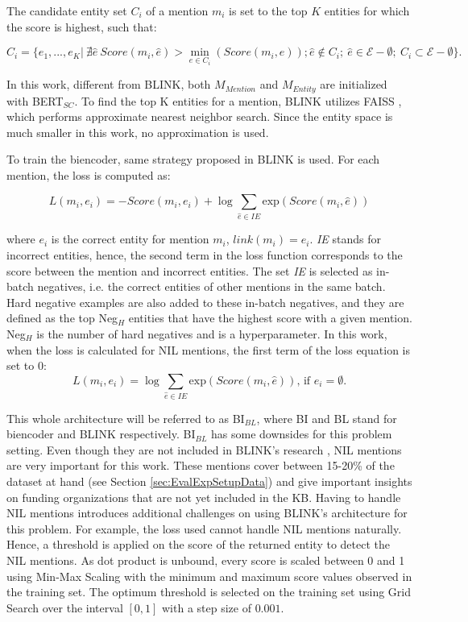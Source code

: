 \documentclass{report}
\theoremstyle{definition}
\theoremstyle{remark}
\begin{document}
The candidate entity set $C_i$ of a mention $m_i$ is set to the top $K$ entities for which the score is highest, such that:

\begin{equation}
    C_i = \{e_1,...,e_K | \ \nexists\hat{e} \ Score(m_i,\hat{e}) > \min_{e\in C_i}(Score(m_i, e )); \hat{e} \notin C_i; \ \hat{e} \in \mathcal{E}-\emptyset; \ C_i \subset \mathcal{E}-\emptyset  \}.
\end{equation}

In this work, different from BLINK, both $M_{Mention}$ and $M_{Entity}$ are initialized with BERT$_{SC}$. To find the top K entities for a mention, BLINK utilizes FAISS \cite{faiss}, which performs approximate nearest neighbor search. Since the entity space is much smaller in this work, no approximation is used. 

To train the biencoder, same strategy proposed in BLINK is used. For each mention, the loss is computed as:

\begin{equation}
    L(m_i,e_i) = -Score(m_i,e_i) + \log \sum_{\hat{e} \in IE} \text{exp}( Score(m_i,\hat{e}))
\end{equation}

\noindent where $e_i$ is the correct entity for mention $m_i$, $link(m_i)=e_i$. \textit{IE} stands for incorrect entities, hence, the second term in the loss function corresponds to the score between the mention and incorrect entities. The set \textit{IE} is selected as in-batch negatives, i.e. the correct entities of other mentions in the same batch. Hard negative examples are also added to these in-batch negatives, and they are defined as the top Neg$_H$ entities that have the highest score with a given mention. Neg$_H$ is the number of hard negatives and is a hyperparameter. In this work, when the loss is calculated for NIL mentions, the first term of the loss equation is set to 0:
\begin{equation}
    L(m_i,e_i) = \log \sum_{\hat{e} \in IE} \text{exp}( Score(m_i,\hat{e})) \text{, if } e_i = \emptyset.
\end{equation}

This whole architecture will be referred to as BI$_{BL}$, where BI and BL stand for biencoder and BLINK respectively. BI$_{BL}$ has some downsides for this problem setting. Even though they are not included in BLINK's research \cite{scalablezeroshot}, NIL mentions are very important for this work. These mentions cover between 15-20\% of the dataset at hand (see Section \ref{sec:EvalExpSetupData}) and give important insights on funding organizations that are not yet included in the KB. Having to handle NIL mentions introduces additional challenges on using BLINK's architecture for this problem. For example, the loss used cannot handle NIL mentions naturally. Hence, a threshold is applied on the score of the returned entity to detect the NIL mentions. As dot product is unbound, every score is scaled between 0 and 1 using Min-Max Scaling with the minimum and maximum score values observed in the training set. The optimum threshold is selected on the training set using Grid Search over the interval $[0,1]$ with a step size of $0.001$.
\end{document}
